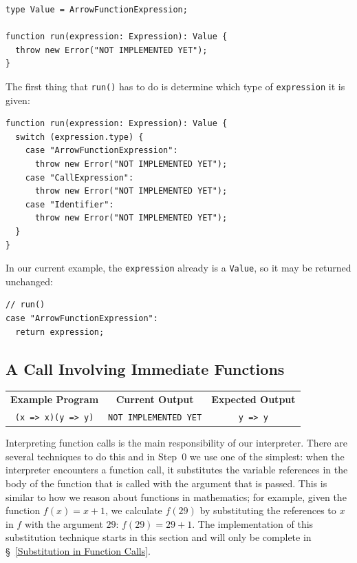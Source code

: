 \documentclass[12pt, oneside]{book}
\begin{document}
\begin{verbatim}
type Value = ArrowFunctionExpression;

function run(expression: Expression): Value {
  throw new Error("NOT IMPLEMENTED YET");
}
\end{verbatim}

The first thing that \texttt{run()} has to do is determine which type of \texttt{expression} it is given:

\begin{verbatim}
function run(expression: Expression): Value {
  switch (expression.type) {
    case "ArrowFunctionExpression":
      throw new Error("NOT IMPLEMENTED YET");
    case "CallExpression":
      throw new Error("NOT IMPLEMENTED YET");
    case "Identifier":
      throw new Error("NOT IMPLEMENTED YET");
  }
}
\end{verbatim}

In our current example, the \texttt{expression} already is a \texttt{Value}, so it may be returned unchanged:

\begin{verbatim}
// run()
case "ArrowFunctionExpression":
  return expression;
\end{verbatim}

\subsection{A Call Involving Immediate Functions}
\label{A Call Involving Immediate Functions}

\begin{center}
\begin{tabular}{c|c|c}
\textbf{Example Program} & \textbf{Current Output} & \textbf{Expected Output} \\
\texttt{(x => x)(y => y)} & \texttt{NOT IMPLEMENTED YET} & \texttt{y => y} \\
\end{tabular}
\end{center}

Interpreting function calls is the main responsibility of our interpreter. There are several techniques to do this and in Step~0 we use one of the simplest: when the interpreter encounters a function call, it substitutes the variable references in the body of the function that is called with the argument that is passed. This is similar to how we reason about functions in mathematics; for example, given the function $f(x) = x + 1$, we calculate $f(29)$ by substituting the references to $x$ in $f$ with the argument $29$: $f(29) = 29 + 1$. The implementation of this substitution technique starts in this section and will only be complete in §~\ref{Substitution in Function Calls}.
\end{document}
